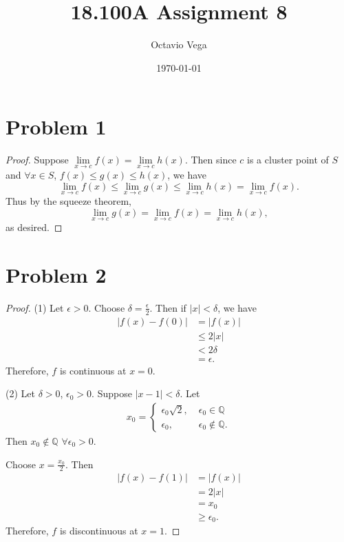 \documentclass{article}
\title{18.100A Assignment 8}
\author{Octavio Vega}
\date\today
\newcommand{\Q}{\mathbb{Q}} %
\begin{document}
\maketitle

\section*{Problem 1}
\begin{proof}
	Suppose $\lim\limits_{x \to c} f(x) = \lim\limits_{x \to c} h(x)$. Then since $c$ is a cluster point of $S$ and $\forall x \in S$, $f(x) \leq g(x) \leq h(x)$, we have
	\begin{equation}
		\lim\limits_{x \to c} f(x) \leq \lim\limits_{x \to c} g(x) \leq \lim\limits_{x \to c} h(x) = \lim\limits_{x \to c} f(x).
	\end{equation}
	Thus by the squeeze theorem, 
	\begin{equation}
		\lim\limits_{x \to c} g(x) = \lim\limits_{x \to c} f(x) = \lim\limits_{x \to c} h(x),
	\end{equation}
	as desired.
\end{proof}
\section*{Problem 2}
\begin{proof}
	(1) Let $\epsilon > 0$. Choose $\delta = \frac{\epsilon}{2}$. Then if $|x| < \delta$, we have
	\begin{align}
		|f(x) - f(0)| &= |f(x)| \\
		&\leq 2 |x| \\
		& < 2 \delta \\
		&= \epsilon.
	\end{align}
	Therefore, $f$ is continuous at $x = 0$.
	
	(2) Let $\delta > 0$, $\epsilon_0 > 0$. Suppose $|x-1| < \delta$. Let
	\begin{align}
		x_0 = 
		\begin{cases}
			\epsilon_0 \sqrt{2}, \; &\epsilon_0 \in \Q \\
			\epsilon_0, \; &\epsilon_0 \notin \Q.
		\end{cases}
	\end{align}
	Then $x_0 \notin \Q$ $\forall \epsilon_0 > 0$. 
	
	Choose $x = \frac{x_0}{2}$. Then
	\begin{align}
		|f(x) - f(1)| &= |f(x)| \\
		&= 2 |x| \\
		&= x_0 \\
		&\geq \epsilon_0.
	\end{align}
	Therefore, $f$ is discontinuous at $x = 1$.
\end{proof}
	
\end{document}
